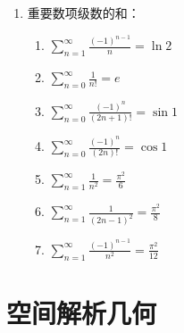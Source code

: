 \documentclass[UTF8]{ctexart}
\theoremstyle{remark}
\begin{document}
\begin{enumerate}
	\item 重要数项级数的和：  
	\begin{enumerate}
		\item \(\sum_{n=1}^{\infty} \frac{(-1)^{n-1}}{n} = \ln 2\)  
		\item \(\sum_{n=0}^{\infty} \frac{1}{n!} = e\)  
		\item \(\sum_{n=0}^{\infty} \frac{(-1)^n}{(2n+1)!} = \sin 1\)  
		\item \(\sum_{n=0}^{\infty} \frac{(-1)^n}{(2n)!} = \cos 1\)  
		\item \(\sum_{n=1}^{\infty} \frac{1}{n^2} = \frac{\pi^2}{6}\)  
		\item \(\sum_{n=1}^{\infty} \frac{1}{(2n-1)^2} = \frac{\pi^2}{8}\)  
		\item \(\sum_{n=1}^{\infty} \frac{(-1)^{n-1}}{n^2} = \frac{\pi^2}{12}\)  
	\end{enumerate}
\end{enumerate}

\section{空间解析几何}
\end{document}
